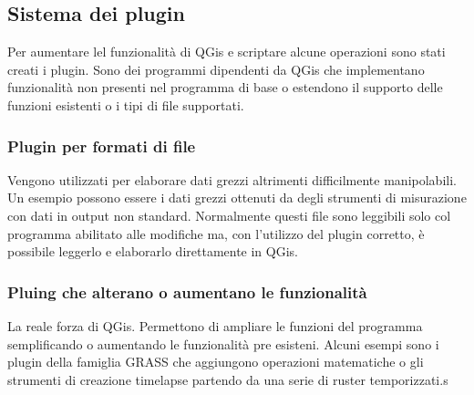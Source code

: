 \subsection{Sistema dei plugin}
Per aumentare lel funzionalità di QGis e scriptare alcune operazioni sono stati creati i plugin.
Sono dei programmi dipendenti da QGis che implementano funzionalità non presenti nel programma di base o estendono il supporto delle funzioni esistenti o i tipi di file supportati.

\subsubsection{Plugin per formati di file}
Vengono utilizzati per elaborare dati grezzi altrimenti difficilmente manipolabili. 
Un esempio possono essere i dati grezzi ottenuti da degli strumenti di misurazione con dati in output non standard.
Normalmente questi file sono leggibili solo col programma abilitato alle modifiche ma, con l'utilizzo del plugin corretto, è possibile leggerlo e elaborarlo direttamente in QGis.

\subsubsection{Pluing che alterano o aumentano le funzionalità}
La reale forza di QGis. Permettono di ampliare le funzioni del programma semplificando o aumentando le funzionalità pre esisteni. Alcuni esempi sono i plugin della famiglia GRASS che aggiungono operazioni matematiche o gli strumenti di creazione timelapse partendo da una serie di ruster temporizzati.s